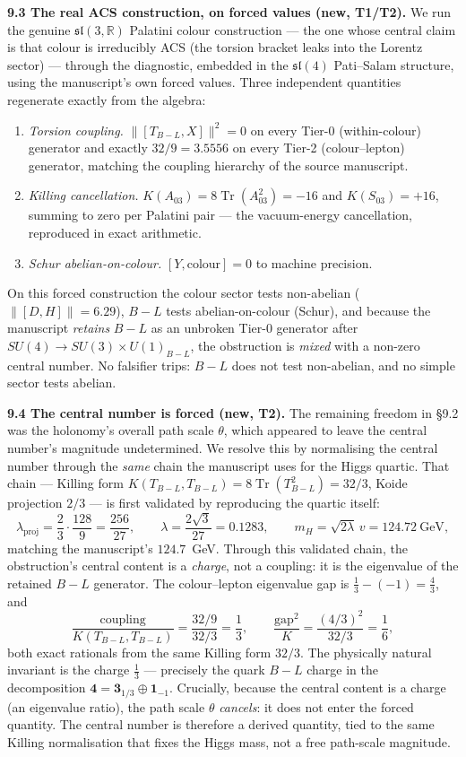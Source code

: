 \documentclass[11pt]{article}
\newcommand{\Tr}{\operatorname{Tr}}
\newcommand{\R}{\mathbb{R}}
\begin{document}
\textbf{9.3 The real ACS construction, on forced values (new, T1/T2).} We run the genuine $\mathfrak{sl}(3,\R)$ Palatini colour construction --- the one whose central claim is that colour is irreducibly ACS (the torsion bracket leaks into the Lorentz sector) --- through the diagnostic, embedded in the $\mathfrak{sl}(4)$ Pati--Salam structure, using the manuscript's own forced values. Three independent quantities regenerate exactly from the algebra:
\begin{enumerate}[nosep]
\item \emph{Torsion coupling.} $\|[T_{B-L},X]\|^2=0$ on every Tier-0 (within-colour) generator and exactly $32/9=3.5556$ on every Tier-2 (colour--lepton) generator, matching the coupling hierarchy of the source manuscript.
\item \emph{Killing cancellation.} $K(A_{03})=8\Tr(A_{03}^2)=-16$ and $K(S_{03})=+16$, summing to zero per Palatini pair --- the vacuum-energy cancellation, reproduced in exact arithmetic.
\item \emph{Schur abelian-on-colour.} $[Y,\text{colour}]=0$ to machine precision.
\end{enumerate}
On this forced construction the colour sector tests non-abelian ($\|[D,H]\|=6.29$), $B\!-\!L$ tests abelian-on-colour (Schur), and because the manuscript \emph{retains} $B\!-\!L$ as an unbroken Tier-0 generator after $SU(4)\to SU(3)\times U(1)_{B-L}$, the obstruction is \emph{mixed} with a non-zero central number. No falsifier trips: $B\!-\!L$ does not test non-abelian, and no simple sector tests abelian.

\textbf{9.4 The central number is forced (new, T2).} The remaining freedom in \S9.2 was the holonomy's overall path scale $\theta$, which appeared to leave the central number's magnitude undetermined. We resolve this by normalising the central number through the \emph{same} chain the manuscript uses for the Higgs quartic. That chain --- Killing form $K(T_{B-L},T_{B-L})=8\Tr(T_{B-L}^2)=32/3$, Koide projection $2/3$ --- is first validated by reproducing the quartic itself:
\[
\lambda_{\text{proj}}=\frac{2}{3}\cdot\frac{128}{9}=\frac{256}{27},\qquad
\lambda=\frac{2\sqrt3}{27}=0.1283,\qquad
m_H=\sqrt{2\lambda}\,v=124.72~\text{GeV},
\]
matching the manuscript's $124.7$~GeV. Through this validated chain, the obstruction's central content is a \emph{charge}, not a coupling: it is the eigenvalue of the retained $B\!-\!L$ generator. The colour--lepton eigenvalue gap is $\tfrac13-(-1)=\tfrac43$, and
\[
\frac{\text{coupling}}{K(T_{B-L},T_{B-L})}=\frac{32/9}{32/3}=\frac13,
\qquad
\frac{\text{gap}^2}{K}=\frac{(4/3)^2}{32/3}=\frac16,
\]
both exact rationals from the same Killing form $32/3$. The physically natural invariant is the charge $\tfrac13$ --- precisely the quark $B\!-\!L$ charge in the decomposition $\mathbf4=\mathbf3_{1/3}\oplus\mathbf1_{-1}$. Crucially, because the central content is a charge (an eigenvalue ratio), the path scale $\theta$ \emph{cancels}: it does not enter the forced quantity. The central number is therefore a derived quantity, tied to the same Killing normalisation that fixes the Higgs mass, not a free path-scale magnitude.
\end{document}
